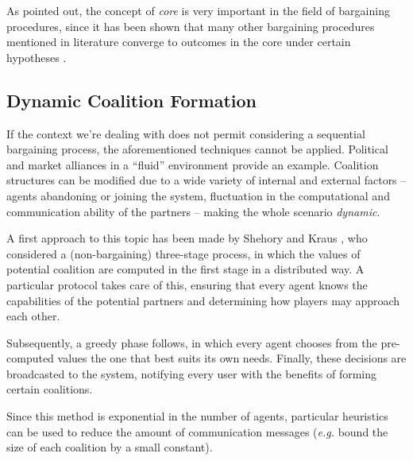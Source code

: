 \documentclass[11pt, twoside, titlepage, a4paper, openright]{report}
\begin{document}
As pointed out, the concept of \textit{core} is very important in the field of bargaining procedures, since it has been shown that many other bargaining procedures mentioned in literature converge to outcomes in the core under certain hypotheses \cite{RePEc:eee:gamebe:v:19:y:1997:i:2:p:211-220,RePEc:ecm:emetrp:v:64:y:1996:i:2:p:357-80,RePEc:eee:gamebe:v:9:y:1995:i:1:p:21-34,RePEc:ecm:emetrp:v:62:y:1994:i:4:p:795-817,RePEc:spr:sochwe:v:14:y:1997:i:4:p:513-525,springerlink:10.1007/s001820300137}.

\subsection{Dynamic Coalition Formation}

If the context we're dealing with does not permit considering a sequential bargaining process, the aforementioned techniques cannot be applied. Political and market alliances in a ``fluid'' environment provide an example. Coalition structures can be modified due to a wide variety of internal and external factors -- agents abandoning or joining the system, fluctuation in the computational and communication ability of the partners -- making the whole scenario \textit{dynamic}.

A first approach to this topic has been made by Shehory and Kraus \cite{DBLP:journals/ai/ShehoryK98}, who considered a (non-bargaining) three-stage process, in which the values of potential coalition are computed in the first stage in a distributed way. A particular protocol takes care of this, ensuring that every agent knows the capabilities of the potential partners and determining how players may approach each other. 

\noindent Subsequently, a greedy phase follows, in which every agent chooses from the pre-computed values the one that best suits its own needs. Finally, these decisions are broadcasted to the system, notifying every user with the benefits of forming certain coalitions.

Since this method is exponential in the number of agents, particular heuristics can be used to reduce the amount of communication messages (\textit{e.g.} bound the size of each coalition by a small constant).
\end{document}
